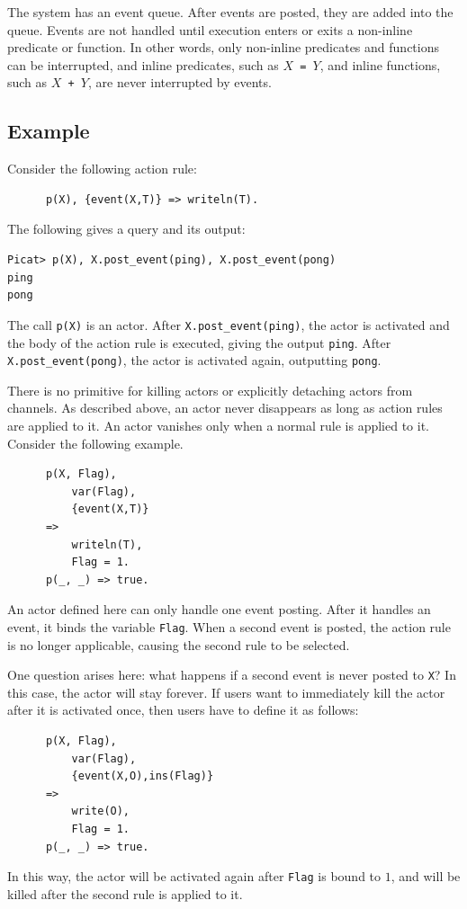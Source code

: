 The system has an event queue. After events are posted, they are added into the queue. Events are not handled until execution enters or exits a non-inline predicate or function. In other words, only non-inline predicates and functions can be interrupted, and inline predicates, such as \texttt{$X$ = $Y$}, and inline functions, such as \texttt{$X$ + $Y$}, are never interrupted by events.

\subsection*{Example}
Consider the following action rule:
\begin{verbatim}
      p(X), {event(X,T)} => writeln(T).
\end{verbatim}
The following gives a query and its output:
\begin{verbatim}
Picat> p(X), X.post_event(ping), X.post_event(pong)
ping
pong
\end{verbatim}
The call \texttt{p(X)} is an actor. After {\tt X.post\_event(ping)}, the actor is activated and the body of the action rule is executed, giving the output {\tt ping}. After \texttt{X.post\_event(pong)}, the actor is activated again, outputting {\tt pong}.


There is no primitive for killing actors or explicitly detaching actors from channels. As described above, an actor never disappears as long as action rules are applied to it. An actor vanishes only when a normal rule is applied to it. Consider the following example.
\begin{verbatim}
      p(X, Flag), 
          var(Flag), 
          {event(X,T)}
      => 
          writeln(T),
          Flag = 1.
      p(_, _) => true.
\end{verbatim}
An actor defined here can only handle one event posting. After it handles an event, it binds the variable \texttt{Flag}. When a second event is posted, the action rule is no longer applicable, causing the second rule to be selected.

One question arises here: what happens if a second event is never posted to \texttt{X}? In this case, the actor will stay forever. If users want to immediately kill the actor after it is activated once, then users have to define it as follows:
\begin{verbatim}
      p(X, Flag), 
          var(Flag), 
          {event(X,O),ins(Flag)}
      => 
          write(O),
          Flag = 1.
      p(_, _) => true.
\end{verbatim}
In this way, the actor will be activated again after \texttt{Flag} is bound to $1$, and will be killed after the second rule is applied to it.

